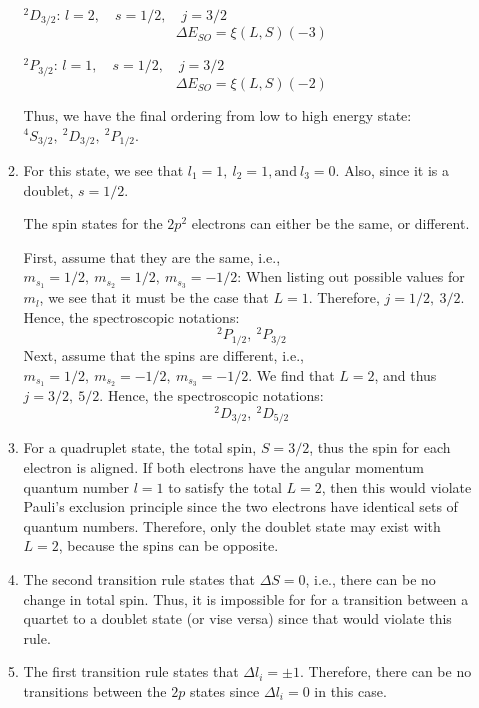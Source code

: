 \documentclass[10pt]{article}
\begin{document}
\begin{enumerate}
\begin{enumerate}
    $ ^2D_{3/2} $: $ l=2,\quad s= 1 / 2, \quad j = 3 / 2$
    \[
      \Delta E_{SO} = \xi \left( L,S \right) \left( -3 \right)
    \]
    
    $ ^2P_{3/2} $: $ l=1,\quad s= 1 / 2, \quad j = 3 / 2$
    \[
      \Delta E_{SO} = \xi \left( L,S \right) \left( -2 \right)
    \]

    Thus, we have the final ordering from low to high energy state: $ ^4S_{3 / 2},~ ^2D_{3 / 2},~^2P_{1/2} $.
  \item
    For this state, we see that $ l_1=1,~l_2=1, \text{and}~l_3=0 $. Also, since it is a doublet, $ s= 1 / 2 $.

    The spin states for the $ 2p^2 $ electrons can either be the same, or different.

    First, assume that they are the same, i.e., $ m_{s_1} = 1 / 2,~m_{s_2}=1 / 2,~m_{s_3} = - 1 / 2 $: When listing out possible values for $ m_l $, we see that it must be the case that $ L=1 $. Therefore, $ j=1 / 2,~3 / 2 $. Hence, the spectroscopic notations:
    \[
      ^2P_{1 / 2},~ ^2P_{3 / 2}
    \]
    Next, assume that the spins are different, i.e., $ m_{s_1} = 1 / 2,~m_{s_2}=-1 / 2,~m_{s_3} = - 1 / 2 $. We find that $ L=2 $, and thus $ j = 3 / 2,~5 / 2 $. Hence, the spectroscopic notations:
    \[
      ^2D_{3 / 2},~ ^2D_{5 / 2}
    \]
  \item
    For a quadruplet state, the total spin, $ S=3/2 $, thus the spin for each electron is aligned. If both electrons have the angular momentum quantum number $ l=1 $ to satisfy the total $ L=2 $, then this would violate Pauli's exclusion principle since the two electrons have identical sets of quantum numbers. Therefore, only the doublet state may exist with $ L=2 $, because the spins can be opposite.
  \item
    The second transition rule states that $ \Delta S = 0 $, i.e., there can be no change in total spin. Thus, it is impossible for for a transition between a quartet to a doublet state (or vise versa) since that would violate this rule.
  \item
    The first transition rule states that $ \Delta l_i = \pm 1 $. Therefore, there can be no transitions between the $ 2p $ states since $ \Delta l_i = 0 $ in this case.
  \end{enumerate}
\end{enumerate}
\end{document}
